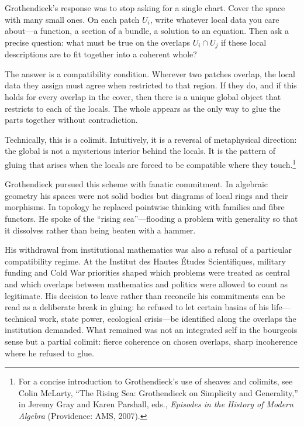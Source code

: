 \documentclass[12pt,a4paper]{article}
\begin{document}
Grothendieck's response was to stop asking for a single chart. Cover the space with many small ones. On each patch $U_i$, write whatever local data you care about---a function, a section of a bundle, a solution to an equation. Then ask a precise question: what must be true on the overlaps $U_i \cap U_j$ if these local descriptions are to fit together into a coherent whole?

The answer is a compatibility condition. Wherever two patches overlap, the local data they assign must agree when restricted to that region. If they do, and if this holds for every overlap in the cover, then there is a unique global object that restricts to each of the locals. The whole appears as the only way to glue the parts together without contradiction.

Technically, this is a colimit. Intuitively, it is a reversal of metaphysical direction: the global is not a mysterious interior behind the locals. It is the pattern of gluing that arises when the locals are forced to be compatible where they touch.\footnote{For a concise introduction to Grothendieck's use of sheaves and colimits, see Colin McLarty, ``The Rising Sea: Grothendieck on Simplicity and Generality,'' in Jeremy Gray and Karen Parshall, eds., \emph{Episodes in the History of Modern Algebra} (Providence: AMS, 2007).}

Grothendieck pursued this scheme with fanatic commitment. In algebraic geometry his spaces were not solid bodies but diagrams of local rings and their morphisms. In topology he replaced pointwise thinking with families and fibre functors. He spoke of the ``rising sea''---flooding a problem with generality so that it dissolves rather than being beaten with a hammer.

His withdrawal from institutional mathematics was also a refusal of a particular compatibility regime. At the Institut des Hautes \'Etudes Scientifiques, military funding and Cold War priorities shaped which problems were treated as central and which overlaps between mathematics and politics were allowed to count as legitimate. His decision to leave rather than reconcile his commitments can be read as a deliberate break in gluing: he refused to let certain basins of his life---technical work, state power, ecological crisis---be identified along the overlaps the institution demanded. What remained was not an integrated self in the bourgeois sense but a partial colimit: fierce coherence on chosen overlaps, sharp incoherence where he refused to glue.
\end{document}
